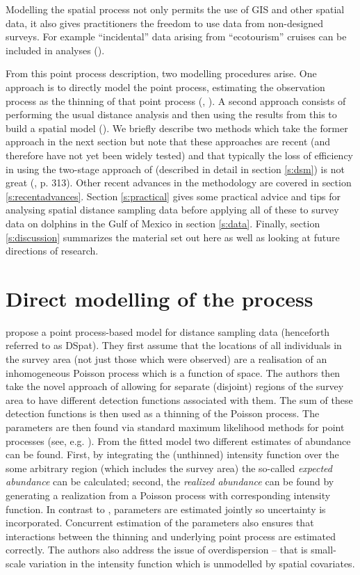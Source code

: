 \documentclass[a4paper,12pt]{article}
\begin{document}
Modelling the spatial process not only permits the use of GIS and other spatial data, it also gives practitioners the freedom to use data from non-designed surveys. For example ``incidental'' data arising from ``ecotourism'' cruises can be included in analyses (\cite{Williams:2006tz}).

From this point process description, two modelling procedures arise. One approach is to directly model the point process, estimating the observation process as the thinning of that point process (\cite{Niemi:2010kx}, \cite{Johnson:2010gf}). A second approach consists of performing the usual distance analysis and then using the results from this to build a spatial model (\cite{Hedley:2004et}). We briefly describe two methods which take the former approach in the next section but note that these approaches are recent (and therefore have not yet been widely tested) and that typically the loss of efficiency in using the two-stage approach of \cite{Hedley:2004et} (described in detail in section \ref{s:dsm}) is not great (\cite{Buckland:2004ts}, p. 313). Other recent advances in the methodology are covered in section \ref{s:recentadvances}. Section \ref{s:practical} gives some practical advice and tips for analysing spatial distance sampling data before applying all of these to survey data on dolphins in the Gulf of Mexico in section \ref{s:data}. Finally, section \ref{s:discussion} summarizes the material set out here as well as looking at future directions of research.

\section*{Direct modelling of the process}
\label{s:direct}

\cite{Johnson:2010gf} propose a point process-based model for distance sampling data (henceforth referred to as DSpat). They first assume that the locations of all individuals in the survey area (not just those which were observed) are a realisation of an inhomogeneous Poisson process which is a function of space. The authors then take the novel approach of allowing for separate (disjoint) regions of the survey area to have different detection functions associated with them. The sum of these detection functions is then used as a thinning of the Poisson process. The parameters are then found via standard maximum likelihood methods for point processes (see, e.g. \cite{Baddeley:2000to}). From the fitted model two different estimates of abundance can be found. First, by integrating the (unthinned) intensity function over the some arbitrary region (which includes the survey area) the so-called \textit{expected abundance} can be calculated; second, the \textit{realized abundance} can be found by generating a realization from a Poisson process with corresponding intensity function. In contrast to \cite{Hedley:2004et}, parameters are estimated jointly so uncertainty is incorporated. Concurrent estimation of the parameters also ensures that interactions between the thinning and underlying point process are estimated correctly. The authors also address the issue of overdispersion -- that is small-scale variation in the intensity function which is unmodelled by spatial covariates. 
\end{document}
